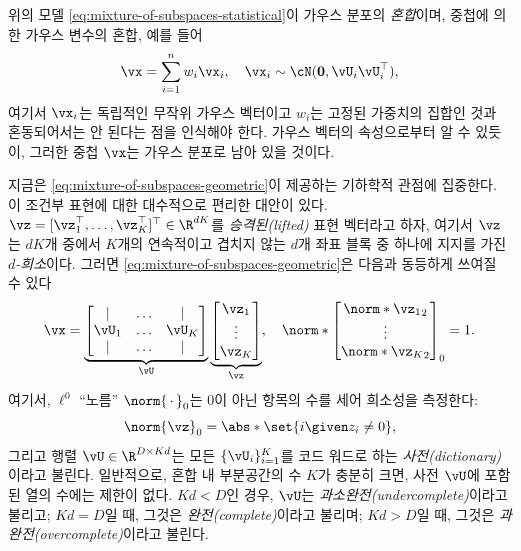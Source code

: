 \documentclass[../../book-main_ko.tex]{subfiles}
\begin{document}
\begin{remark}
위의 모델 \eqref{eq:mixture-of-subspaces-statistical}이 가우스 분포의 \textit{혼합}이며, 중첩에 의한 가우스 변수의 혼합, 예를 들어
\begin{equation}
    \vx = \sum_{i=1}^n w_i \vx_i, \quad \vx_i \sim \cN(\mathbf{0}, \vU_i\vU_i^\top),
\end{equation}
여기서 \(\vx_i\)는 독립적인 무작위 가우스 벡터이고 \(w_i\)는 고정된 가중치의 집합인 것과 혼동되어서는 안 된다는 점을 인식해야 한다. 가우스 벡터의 속성으로부터 알 수 있듯이, 그러한 중첩 \(\vx\)는 가우스 분포로 남아 있을 것이다.
\end{remark}

지금은 \eqref{eq:mixture-of-subspaces-geometric}이 제공하는 기하학적 관점에 집중한다.
이 조건부 표현에 대한 대수적으로 편리한 대안이 있다. \(\vz = [\vz_1^\top, \dots, \vz_K^\top]^\top \in \R^{dK}\)를 \textit{승격된(lifted)} 표현 벡터라고 하자, 여기서 \(\vz\)는 \(dK\)개 중에서 \(K\)개의 연속적이고 겹치지 않는 \(d\)개 좌표 블록 중 하나에 지지를 가진 \textit{\(d\)-희소}이다.
그러면 \eqref{eq:mixture-of-subspaces-geometric}은 다음과 동등하게 쓰여질 수 있다
\begin{equation}\label{eq:mixture-of-subspaces-dictionary-pre}
    \vx =
    \underbrace{
    \begin{bmatrix}
    | & \hdots & |  \\
    \vU_1 & \hdots & \vU_K  \\
    | & \hdots & |
    \end{bmatrix}
    }_{\vU}
    \underbrace{
    \begin{bmatrix} \vz_1 \\ \vdots \\ \vz_K \end{bmatrix}
    }_{\vz},
    \quad
    \norm*{
    \begin{bmatrix} \norm*{\vz_1}_2 \\ \vdots \\ \norm*{\vz_K}_2 \end{bmatrix}
    }_0 = 1.
\end{equation}
여기서, \(\ell^0\) ``노름'' \(\norm{\,\cdot\,}_0\)는 0이 아닌 항목의 수를 세어 희소성을 측정한다:
\begin{equation}\label{eq:ell-zero-norm}
    \norm{\vz}_0 = \abs*{\set{i \given z_i \neq 0}},
\end{equation}
그리고 행렬 \(\vU \in \R^{D \times Kd}\)는 모든 \(\{\vU_i\}_{i=1}^K\)를 코드 워드로 하는 \textit{사전(dictionary)}이라고 불린다. 일반적으로, 혼합 내 부분공간의 수 \(K\)가 충분히 크면, 사전 \(\vU\)에 포함된 열의 수에는 제한이 없다. \(Kd < D\)인 경우, \(\vU\)는 \textit{과소완전(undercomplete)}이라고 불리고;
\(Kd = D\)일 때, 그것은 \textit{완전(complete)}이라고 불리며; \(Kd > D\)일 때, 그것은 \textit{과완전(overcomplete)}이라고 불린다.
\end{document}
